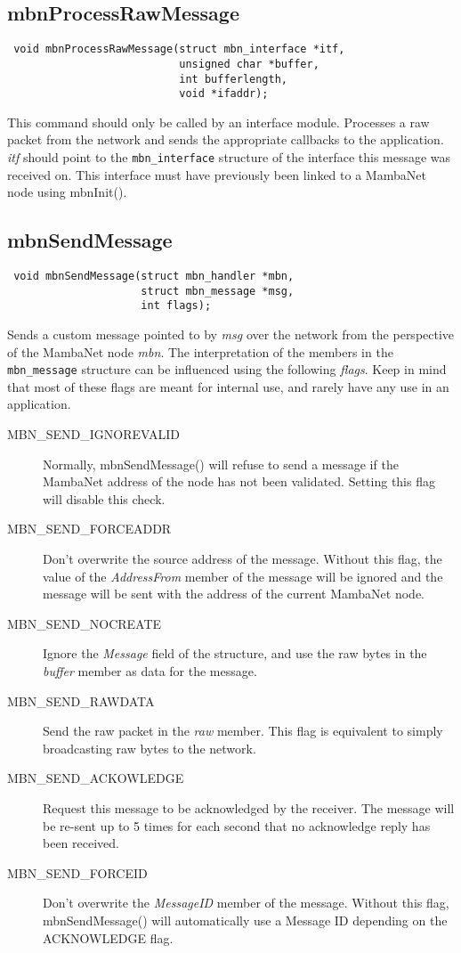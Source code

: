 \subsection{mbnProcessRawMessage}
\begin{verbatim}
 void mbnProcessRawMessage(struct mbn_interface *itf,
                           unsigned char *buffer,
                           int bufferlength,
                           void *ifaddr);
\end{verbatim}
This command should only be called by an interface module. Processes a raw packet from the network and sends the appropriate callbacks to the application. \textit{itf} should point to the \verb|mbn_interface| structure of the interface this message was received on. This interface must have previously been linked to a MambaNet node using mbnInit().


\subsection{mbnSendMessage}
\begin{verbatim}
 void mbnSendMessage(struct mbn_handler *mbn,
                     struct mbn_message *msg,
                     int flags);
\end{verbatim}
Sends a custom message pointed to by \textit{msg} over the network from the perspective of the MambaNet node \textit{mbn}. The interpretation of the members in the \verb|mbn_message| structure can be influenced using the following \textit{flags}. Keep in mind that most of these flags are meant for internal use, and rarely have any use in an application.
\begin{description}
  \item[MBN\_SEND\_IGNOREVALID]
   Normally, mbnSendMessage() will refuse to send a message if the MambaNet address of the node has not been validated. Setting this flag will disable this check.
  \item[MBN\_SEND\_FORCEADDR]
   Don't overwrite the source address of the message. Without this flag, the value of the \textit{AddressFrom} member of the message will be ignored and the message will be sent with the address of the current MambaNet node.
  \item[MBN\_SEND\_NOCREATE]
   Ignore the \textit{Message} field of the structure, and use the raw bytes in the \textit{buffer} member as data for the message.
  \item[MBN\_SEND\_RAWDATA]
   Send the raw packet in the \textit{raw} member. This flag is equivalent to simply broadcasting raw bytes to the network.
  \item[MBN\_SEND\_ACKOWLEDGE]
   Request this message to be acknowledged by the receiver. The message will be re-sent up to 5 times for each second that no acknowledge reply has been received.
  \item[MBN\_SEND\_FORCEID]
   Don't overwrite the \textit{MessageID} member of the message. Without this flag, mbnSendMessage() will automatically use a Message ID depending on the ACKNOWLEDGE flag.
\end{description}


